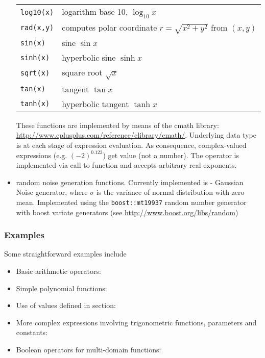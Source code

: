 \begin{itemize}
\begin{center}
\begin{tabular}{ll}
  \texttt{log10(x)}   & logarithm base 10, $\log_{10} x$ \\
  \texttt{rad(x,y)}   & computes polar coordinate $r=\sqrt{x^2+y^2}$ from $(x,y)$\\
  \texttt{sin(x)}     & sine $\sin x$ \\
  \texttt{sinh(x)}    & hyperbolic sine $\sinh x$ \\
  \texttt{sqrt(x)}    & square root $\sqrt{x}$ \\
  \texttt{tan(x)}     & tangent $\tan x$ \\
  \texttt{tanh(x)}    & hyperbolic tangent $\tanh x$ \\
  \bottomrule
\end{tabular}
\end{center}

These functions are implemented by means of the cmath library:
\url{http://www.cplusplus.com/reference/clibrary/cmath/}. Underlying data type
is  at each stage of expression evaluation. As consequence,
complex-valued expressions (e.g. $(-2)^0.123$) get value  (not a
number). The operator \inlsh{\^{}} is implemented via call to 
function and accepts arbitrary real exponents.

\item random noise generation functions. Currently implemented is
 - Gaussian Noise generator, where $\sigma$ is the variance
of normal distribution with zero mean. Implemented using the
\texttt{boost::mt19937} random number generator with boost variate generators
(see \url{http://www.boost.org/libs/random})
\end{itemize}


\subsubsection{Examples}
Some straightforward examples include
\begin{itemize}
\item Basic arithmetic operators: 
\item Simple polynomial functions: 
\item Use of values defined in  section:
\item More complex expressions involving trigonometric functions, parameters and
constants: 
\item Boolean operators for multi-domain functions:
\end{itemize}

